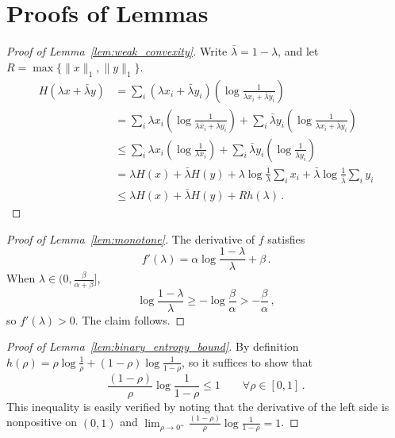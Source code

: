 \documentclass[final,12pt]{colt2018}
\newcommand{\1}{\mathds{1}}
\newcommand*{\ent}[1]{H(#1)}
\begin{document}
\section{Proofs of Lemmas}\label{sec:lemmas}
\begin{proof}[Proof of Lemma~\ref{lem:weak_convexity}]
Write $\bar \lambda = 1 - \lambda$, and let $R = \max\{\|x\|_1, \|y\|_1\}$.
\begin{align*}
\ent{\lambda x + \bar \lambda y} & = \sum_i (\lambda x_i + \bar \lambda y_i) \left(\log \frac{1}{\lambda x_i + \bar \lambda y_i}\right) \\
& = \sum_i \lambda x_i \left(\log \frac{1}{\lambda x_i + \bar \lambda y_i}\right) + \sum_i \bar \lambda y_i \left(\log \frac{1}{\lambda x_i + \bar \lambda y_i}\right) \\
& \leq \sum_i \lambda x_i \left(\log \frac{1}{\lambda x_i}\right) + \sum_i \bar \lambda y_i \left(\log \frac{1}{\bar \lambda y_i}\right) \\
& = \lambda \ent{x} + \bar \lambda \ent{y} + \lambda \log \frac 1 \lambda \sum_i x_i + \bar \lambda \log \frac{1}{\bar \lambda} \sum_i y_i \\
& \leq \lambda \ent{x} + \bar \lambda \ent{y} + Rh(\lambda)\,.
\end{align*}
\end{proof}
\begin{proof}[Proof of Lemma~\ref{lem:monotone}]
The derivative of $f$ satisfies
\begin{equation*}
f'(\lambda) = \alpha \log \frac{1-\lambda}{\lambda} + \beta\,.
\end{equation*}
When $\lambda \in (0, \frac{\beta}{\alpha + \beta}]$,
\begin{equation*}
\log \frac{1-\lambda}{\lambda} \geq - \log \frac{\beta}{\alpha} > - \frac{\beta}{\alpha}\,,
\end{equation*}
so $f'(\lambda) > 0$.
The claim follows.
\end{proof}

\begin{proof}[Proof of Lemma~\ref{lem:binary_entropy_bound}]
By definition $h(\rho) = \rho \log \frac 1 \rho + (1-\rho) \log \frac{1}{1-\rho}$, so it suffices to show that
\begin{equation*}
\frac{(1-\rho)}{\rho} \log \frac{1}{1-\rho} \leq 1 \quad \quad \forall \rho \in [0, 1]\,.
\end{equation*}
This inequality is easily verified by noting that the derivative of the left side is nonpositive on $(0, 1)$ and $\lim_{\rho \to 0^+} \frac{(1-\rho)}{\rho} \log \frac{1}{1-\rho} = 1$.
\end{proof}
\end{document}
